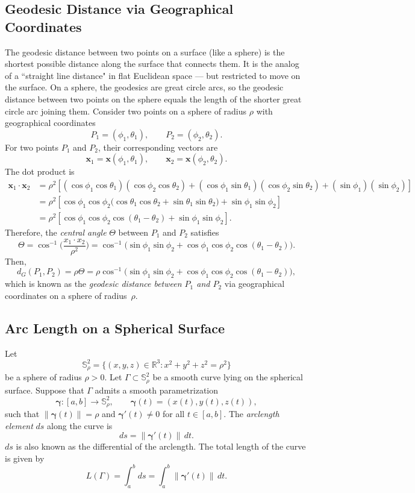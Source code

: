 \documentclass[12pt, reqno]{amsart}
\theoremstyle{plain}
\theoremstyle{definition}
\newcommand{\gq}{\theta}
\newcommand{\gQ}{\Theta}
\newcommand{\tit}{\textit}%
\newcommand{\D}[1]{\mathbb{#1}}%
\begin{document}
\subsection{Geodesic Distance via Geographical Coordinates}
The geodesic distance between two points on a surface (like a sphere) is the shortest possible distance along the surface that connects them.
It is the analog of a ``straight line distance" in flat Euclidean space — but restricted to move on the surface.
On a sphere, the geodesics are great circle arcs, so the geodesic distance between two points on the sphere equals the length of the shorter great circle arc joining them.
Consider two points on a sphere of radius $\rho$ with geographical coordinates
\[
P_1 = (\phi_1, \gq_1), \qquad P_2 = (\phi_2, \gq_2).
\]
For two points $P_1$ and $P_2$, their corresponding vectors are
\[
\mathbf{x}_1 = \mathbf{x}(\phi_1,\gq_1),
\qquad
\mathbf{x}_2 = \mathbf{x}(\phi_2,\gq_2).
\]
 The dot product is
\begin{align*}
\mathbf{x}_1 \cdot \mathbf{x}_2
&= \rho^2\left[(\cos\phi_1\cos\gq_1)(\cos\phi_2\cos\gq_2)
+ (\cos\phi_1\sin\gq_1)(\cos\phi_2\sin\gq_2)
+ (\sin\phi_1)(\sin\phi_2)\right]\\[0.5em]
&=\rho^2\left[ \cos\phi_1\cos\phi_2\bigl(\cos\gq_1\cos\gq_2 + \sin\gq_1\sin\gq_2 \bigr)
+ \sin\phi_1\sin\phi_2\right]\\[0.5em]
&= \rho^2\left[\cos\phi_1\cos\phi_2\cos(\gq_1 - \gq_2) + \sin\phi_1\sin\phi_2\right].
\end{align*}
Therefore, the \emph{central angle} $\gQ$ between $P_1$ and $P_2$ satisfies
\[
 \gQ = \cos^{-1}\Big( \frac{x_1\cdot x_2}{\rho^2}\Big)=\cos^{-1}\Big (\sin\phi_1\sin\phi_2 + 
\cos\phi_1\cos\phi_2\cos(\gq_1 - \gq_2)\Big).
\]
Then,  
\begin{equation*}  
d_G(P_1, P_2) = \rho  \gQ=\rho\cos^{-1}\Big (\sin\phi_1\sin\phi_2 + 
\cos\phi_1\cos\phi_2\cos(\gq_1 - \gq_2)\Big),
\end{equation*} 
which is known as the \tit{geodesic distance between $P_1$ and $P_2$} via geographical coordinates on a sphere of radius~$\rho$. 



\subsection{Arc Length on a Spherical Surface}
 Let 
\[
\D S^2_\rho = \{ (x,y,z) \in \mathbb{\D R}^3 : x^2 + y^2 + z^2 = \rho^2 \}
\]
be a sphere of radius \( \rho > 0 \).  
Let \( \Gamma \subset \D S^2_\rho \) be a smooth curve lying on the spherical surface.
Suppose that \( \Gamma \) admits a smooth parametrization
\[
\boldsymbol{\gamma} : [a,b] \to \D S^2_\rho, \qquad 
\boldsymbol{\gamma}(t) = (x(t), y(t), z(t)),
\]
such that \( \|\boldsymbol{\gamma}(t)\| = \rho \) and \( \boldsymbol{\gamma}'(t) \neq 0 \) for all \( t \in [a,b] \).
The \emph{arclength element} $ds$ along the curve is
\[
ds = \|\boldsymbol{\gamma}'(t)\| \, dt.
\]
$ds$ is also known as the differential of the arclength. 
The total length of the curve is given by
\[
L(\Gamma) = \int_a^b  ds=\int_a^b \|\boldsymbol{\gamma}'(t)\| \, dt.
\]
\end{document}
